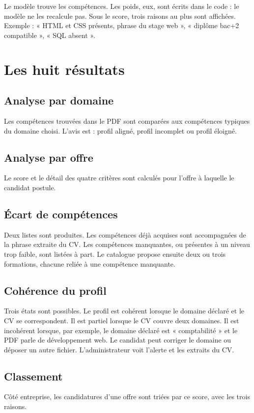 \documentclass[11pt,a4paper]{article}
\begin{document}
Le modèle trouve les compétences. Les poids, eux, sont écrits dans le code : le modèle ne les recalcule pas. Sous le score, trois raisons au plus sont affichées. Exemple : « HTML et CSS présents, phrase du stage web », « diplôme bac+2 compatible », « SQL absent ».

\section{Les huit résultats}

\subsection{Analyse par domaine}
Les compétences trouvées dans le PDF sont comparées aux compétences typiques du domaine choisi. L'avis est : profil aligné, profil incomplet ou profil éloigné.

\subsection{Analyse par offre}
Le score et le détail des quatre critères sont calculés pour l'offre à laquelle le candidat postule.

\subsection{Écart de compétences}
Deux listes sont produites. Les compétences déjà acquises sont accompagnées de la phrase extraite du CV. Les compétences manquantes, ou présentes à un niveau trop faible, sont listées à part. Le catalogue propose ensuite deux ou trois formations, chacune reliée à une compétence manquante.

\subsection{Cohérence du profil}
Trois états sont possibles. Le profil est cohérent lorsque le domaine déclaré et le CV se correspondent. Il est partiel lorsque le CV couvre deux domaines. Il est incohérent lorsque, par exemple, le domaine déclaré est « comptabilité » et le PDF parle de développement web. Le candidat peut corriger le domaine ou déposer un autre fichier. L'administrateur voit l'alerte et les extraits du CV.

\subsection{Classement}
Côté entreprise, les candidatures d'une offre sont triées par ce score, avec les trois raisons.
\end{document}
